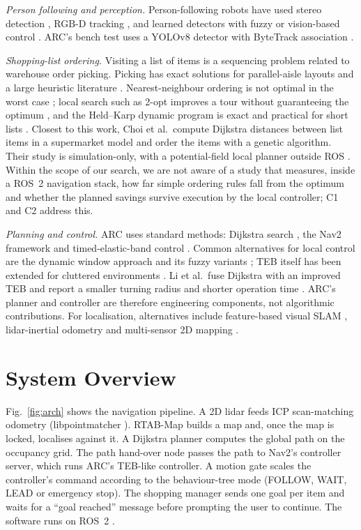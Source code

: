 \documentclass[conference]{IEEEtran}
\begin{document}
\textit{Person following and perception.} Person-following robots have used stereo detection \cite{satake2009}, RGB-D tracking \cite{luber2011,basso2012}, and learned detectors with fuzzy or vision-based control \cite{aye2019,yong2022}. ARC's bench test uses a YOLOv8 detector \cite{yaseen2024} with ByteTrack association \cite{zhang2022}.

\textit{Shopping-list ordering.} Visiting a list of items is a sequencing problem related to warehouse order picking. Picking has exact solutions for parallel-aisle layouts \cite{ratliff1983} and a large heuristic literature \cite{dekoster2007}. Nearest-neighbour ordering is not optimal in the worst case \cite{rosenkrantz1977}; local search such as 2-opt improves a tour without guaranteeing the optimum \cite{croes1958}, and the Held--Karp dynamic program is exact and practical for short lists \cite{held1962}. Closest to this work, Choi et al.\ compute Dijkstra distances between list items in a supermarket model and order the items with a genetic algorithm. Their study is simulation-only, with a potential-field local planner outside ROS \cite{choi2025}. Within the scope of our search, we are not aware of a study that measures, inside a ROS~2 navigation stack, how far simple ordering rules fall from the optimum and whether the planned savings survive execution by the local controller; C1 and C2 address this.

\textit{Planning and control.} ARC uses standard methods: Dijkstra search \cite{dijkstra1959}, the Nav2 framework \cite{macenski2020} and timed-elastic-band control \cite{rosmann2012,rosmann2017}. Common alternatives for local control are the dynamic window approach \cite{fox1997} and its fuzzy variants \cite{rachman2025}; TEB itself has been extended for cluttered environments \cite{wu2021}. Li et al.\ fuse Dijkstra with an improved TEB and report a smaller turning radius and shorter operation time \cite{li2025}. ARC's planner and controller are therefore engineering components, not algorithmic contributions. For localisation, alternatives include feature-based visual SLAM \cite{murartal2017,tourani2022}, lidar-inertial odometry \cite{shan2020} and multi-sensor 2D mapping \cite{altawil2025}.

\section{System Overview}
Fig.~\ref{fig:arch} shows the navigation pipeline. A 2D lidar feeds ICP scan-matching odometry (libpointmatcher \cite{pomerleau2013}). RTAB-Map \cite{labbe2019} builds a map and, once the map is locked, localises against it. A Dijkstra planner computes the global path on the occupancy grid. The path hand-over node passes the path to Nav2's controller server, which runs ARC's TEB-like controller. A motion gate scales the controller's command according to the behaviour-tree \cite{colledanchise2018,iovino2022,ogren2022} mode (FOLLOW, WAIT, LEAD or emergency stop). The shopping manager sends one goal per item and waits for a ``goal reached'' message before prompting the user to continue. The software runs on ROS~2 \cite{macenski2022}.
\end{document}

